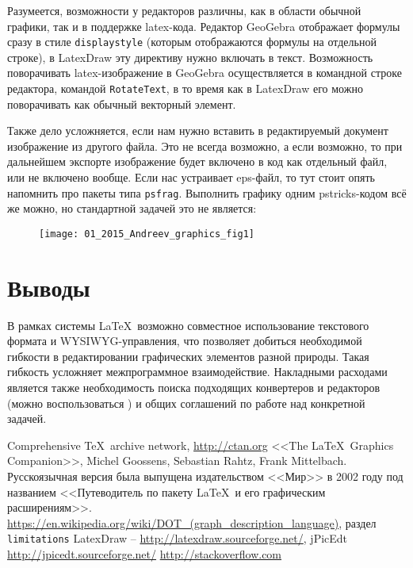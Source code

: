\documentclass[10pt, a5paper]{article}
\begin{document}
Разумеется, возможности у редакторов различны, как в области обычной графики, так и в поддержке latex-кода. 
Редактор GeoGebra отображает формулы сразу в стиле \texttt{displaystyle} (которым отображаются формулы на отдельной строке), в 
LatexDraw эту директиву нужно включать в текст. Возможность поворачивать latex-изображение в GeoGebra осуществляется 
в командной строке редактора, командой \texttt{RotateText},
в то время как в LatexDraw его можно поворачивать как обычный векторный элемент.

Также дело усложняется, если нам нужно вставить в редактируемый документ изображение из другого файла.
Это не всегда возможно, а если возможно, то при дальнейшем экспорте изображение будет включено в код как отдельный файл,
или не включено вообще. Если нас устраивает eps-файл, то тут стоит опять напомнить про пакеты 
типа \texttt{psfrag}. Выполнить графику одним pstricks-кодом всё же можно, но стандартной задачей это не является:      

\begin{figure}[h!]
  \centering
  \texttt{[image: 01\_2015\_Andreev\_graphics\_fig1]}
\end{figure}

 

\section*{Выводы}

В рамках системы \LaTeX \, возможно совместное использование текстового формата и WYSIWYG-управления, 
что позволяет добиться необходимой гибкости в редактировании графических элементов разной природы.
Такая гибкость усложняет межпрограммное взаимодействие. Накладными расходами является также необходимость
поиска подходящих конвертеров и редакторов (можно воспользоваться \cite{RG5}) и общих соглашений по работе
над конкретной задачей.  

\begin{thebibliography}{1}
 Comprehensive \TeX \, archive network, \url{http://ctan.org}
 <<The \LaTeX \, Graphics Companion>>, Michel Goossens, Sebastian Rahtz, Frank Mittelbach. Русскоязычная версия была выпущена 
издательством <<Мир>> в 2002 году под названием <<Путеводитель по пакету \LaTeX \, и его графическим расширениям>>. 
 \url{https://en.wikipedia.org/wiki/DOT_(graph_description_language)}, раздел \texttt{limitations}
 LatexDraw -- \url{http://latexdraw.sourceforge.net/}, jPicEdt \url{http://jpicedt.sourceforge.net/}  
 \url{http://stackoverflow.com}
\end{thebibliography}
\end{document}
